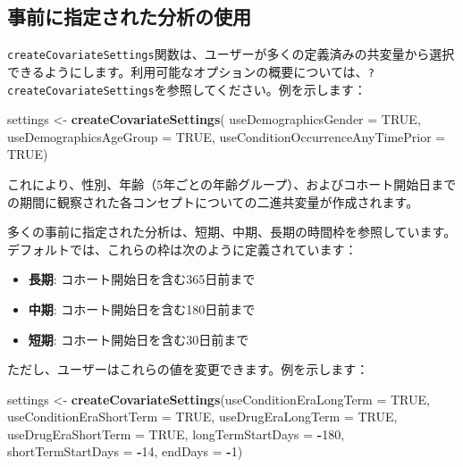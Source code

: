 \documentclass[
  11pt]{book}
\newenvironment{Shaded}{\begin{snugshade}}{\end{snugshade}}
\newcommand{\AttributeTok}[1]{\textcolor[rgb]{0.13,0.29,0.53}{#1}}
\newcommand{\ConstantTok}[1]{\textcolor[rgb]{0.56,0.35,0.01}{#1}}
\newcommand{\DecValTok}[1]{\textcolor[rgb]{0.00,0.00,0.81}{#1}}
\newcommand{\FunctionTok}[1]{\textcolor[rgb]{0.13,0.29,0.53}{\textbf{#1}}}
\newcommand{\NormalTok}[1]{#1}
\newcommand{\OtherTok}[1]{\textcolor[rgb]{0.56,0.35,0.01}{#1}}
\newcommand{\SpecialCharTok}[1]{\textcolor[rgb]{0.81,0.36,0.00}{\textbf{#1}}}
\providecommand{\tightlist}{%
  \setlength{\itemsep}{0pt}\setlength{\parskip}{0pt}}
\theoremstyle{definition}
\theoremstyle{definition}
\theoremstyle{definition}
\theoremstyle{definition}
\theoremstyle{remark}
\begin{document}
\subsection{事前に指定された分析の使用}\label{ux4e8bux524dux306bux6307ux5b9aux3055ux308cux305fux5206ux6790ux306eux4f7fux7528}

\texttt{createCovariateSettings}関数は、ユーザーが多くの定義済みの共変量から選択できるようにします。利用可能なオプションの概要については、\texttt{?createCovariateSettings}を参照してください。例を示します：

\begin{Shaded}
\begin{Highlighting}[]
\NormalTok{settings }\OtherTok{\textless{}{-}} \FunctionTok{createCovariateSettings}\NormalTok{(}
  \AttributeTok{useDemographicsGender =} \ConstantTok{TRUE}\NormalTok{,}
  \AttributeTok{useDemographicsAgeGroup =} \ConstantTok{TRUE}\NormalTok{,}
  \AttributeTok{useConditionOccurrenceAnyTimePrior =} \ConstantTok{TRUE}\NormalTok{)}
\end{Highlighting}
\end{Shaded}

これにより、性別、年齢（5年ごとの年齢グループ）、およびコホート開始日までの期間に観察された各コンセプトについての二進共変量が作成されます。

多くの事前に指定された分析は、短期、中期、長期の時間枠を参照しています。デフォルトでは、これらの枠は次のように定義されています：

\begin{itemize}
\tightlist
\item
  \textbf{長期}: コホート開始日を含む365日前まで
\item
  \textbf{中期}: コホート開始日を含む180日前まで
\item
  \textbf{短期}: コホート開始日を含む30日前まで
\end{itemize}

ただし、ユーザーはこれらの値を変更できます。例を示します：

\begin{Shaded}
\begin{Highlighting}[]
\NormalTok{settings }\OtherTok{\textless{}{-}} \FunctionTok{createCovariateSettings}\NormalTok{(}\AttributeTok{useConditionEraLongTerm =} \ConstantTok{TRUE}\NormalTok{,}
                                    \AttributeTok{useConditionEraShortTerm =} \ConstantTok{TRUE}\NormalTok{,}
                                    \AttributeTok{useDrugEraLongTerm =} \ConstantTok{TRUE}\NormalTok{,}
                                    \AttributeTok{useDrugEraShortTerm =} \ConstantTok{TRUE}\NormalTok{,}
                                    \AttributeTok{longTermStartDays =} \SpecialCharTok{{-}}\DecValTok{180}\NormalTok{,}
                                    \AttributeTok{shortTermStartDays =} \SpecialCharTok{{-}}\DecValTok{14}\NormalTok{,}
                                    \AttributeTok{endDays =} \SpecialCharTok{{-}}\DecValTok{1}\NormalTok{)}
\end{Highlighting}
\end{Shaded}
\end{document}
